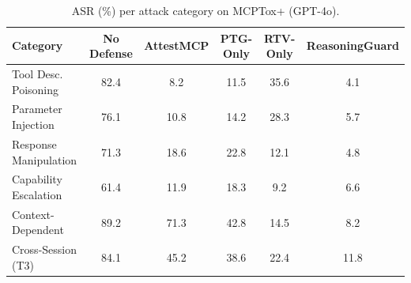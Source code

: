 \begin{table}[t]
\centering\small
\begin{tabular}{lccccc}
\toprule
\textbf{Category} & \textbf{No Defense} & \textbf{AttestMCP} & \textbf{PTG-Only} & \textbf{RTV-Only} & \textbf{ReasoningGuard} \\
\midrule
Tool Desc. Poisoning & 82.4 & 8.2 & 11.5 & 35.6 & 4.1 \\
Parameter Injection & 76.1 & 10.8 & 14.2 & 28.3 & 5.7 \\
Response Manipulation & 71.3 & 18.6 & 22.8 & 12.1 & 4.8 \\
Capability Escalation & 61.4 & 11.9 & 18.3 & 9.2 & 6.6 \\
Context-Dependent & 89.2 & 71.3 & 42.8 & 14.5 & 8.2 \\
Cross-Session (T3) & 84.1 & 45.2 & 38.6 & 22.4 & 11.8 \\
\bottomrule
\end{tabular}
\caption{ASR (\%) per attack category on MCPTox+ (GPT-4o).}
\label{tab:per_category}
\end{table}